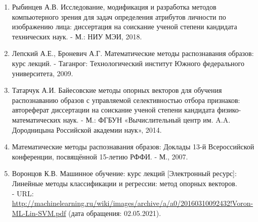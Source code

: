 \documentclass[12pt,a4paper]{article}
\begin{document}
\begin{enumerate}
    \item Рыбинцев А.В. Исследование, модификация и разработка методов компьютерного зрения для задач определения атрибутов личности по изображению лица: диссертация на соискание ученой степени кандидата технических наук. - М.: НИУ МЭИ, 2018.
    \item Лепский А.Е., Броневич А.Г. Математические методы распознавания образов: курс лекций. - Таганрог: Технологический институт Южного федерального университета, 2009.
    \item Татарчук А.И. Байесовские методы опорных векторов для обучения распознаванию образов с управляемой селективностью отбора признаков: автореферат диссертации на соискание ученой степени кандидата физико-математических наук. - М.: ФГБУН «Вычислительный центр им. A.A. Дородницына Российской академии наук», 2014.
    \item Математические методы распознавания образов: Доклады 13-й Всероссийской конференции, посвящённой 15-летию РФФИ. - М., 2007.
    \item Воронцов К.В. Машинное обучение: курс лекций [Электронный ресурс]: Линейные методы классификации и регрессии: метод опорных векторов.\\ - URL: \url{http://machinelearning.ru/wiki/images/archive/a/a0/20160310092432!Voron-ML-Lin-SVM.pdf} (дата обращения: 02.05.2021).
\end{enumerate}
\end{document}
